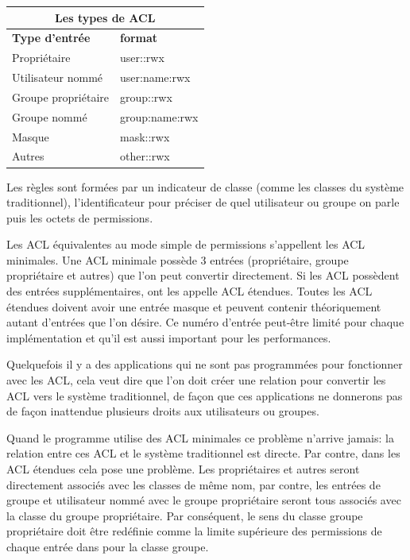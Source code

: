 \documentclass{article}
\begin{document}
\begin{center}
\begin{tabular}{|l|l|}
  \hline
    \multicolumn{2}{|c|}{Les types de ACL} \\
  \hline
\textbf{Type d'entrée} & \textbf{format} \\
  \hline
Propriétaire & user::rwx \\
Utilisateur nommé & user:name:rwx \\
Groupe propriétaire & group::rwx \\
Groupe nommé & group:name:rwx \\
Masque & mask::rwx \\
Autres & other::rwx \\
  \hline
\end{tabular}
\label{tab:entree}
\end{center}
 
Les règles sont formées par un indicateur de classe (comme les classes du système traditionnel), l'identificateur pour préciser de quel utilisateur ou groupe on parle puis les octets de permissions.

Les ACL équivalentes au mode simple de permissions s'appellent les ACL minimales. Une ACL minimale possède 3 entrées (propriétaire, groupe propriétaire et autres) que l'on peut convertir directement. Si les ACL possèdent des entrées supplémentaires, ont les appelle ACL étendues. Toutes les ACL étendues doivent avoir une entrée masque et peuvent contenir théoriquement autant d'entrées que l'on désire. Ce numéro d'entrée peut-être limité pour chaque implémentation et qu'il est aussi important pour les performances.

Quelquefois il y a des applications qui ne sont pas programmées pour fonctionner avec les ACL, cela veut dire que l'on doit créer une relation pour convertir les ACL vers le système traditionnel, de façon que ces applications ne donnerons pas de façon inattendue plusieurs droits aux utilisateurs ou groupes. 

Quand le programme utilise des ACL minimales ce problème n'arrive jamais: la relation entre ces ACL et le système traditionnel est directe. Par contre, dans les ACL étendues cela pose une problème. Les propriétaires et autres seront directement associés avec les classes de même nom, par contre, les entrées de groupe et utilisateur nommé avec le groupe propriétaire seront tous associés avec la classe du groupe propriétaire. Par conséquent, le sens du classe groupe propriétaire doit être redéfinie comme la limite supérieure des permissions de chaque entrée dans pour la classe groupe.
\end{document}
